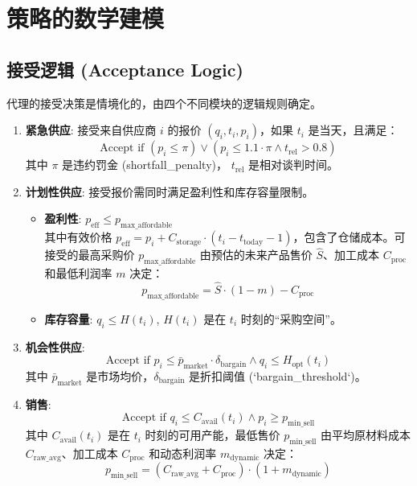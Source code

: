 \documentclass[12pt, a4paper]{article}
\begin{document}
\section{策略的数学建模}

\subsection{接受逻辑 (Acceptance Logic)}
代理的接受决策是情境化的，由四个不同模块的逻辑规则确定。

\begin{enumerate}
\item \textbf{紧急供应}: 接受来自供应商 $i$ 的报价 $(q_i, t_i, p_i)$，如果 $t_i$ 是当天，且满足：
$$
\text{Accept if } (p_i \le \pi) \lor (p_i \le 1.1 \cdot \pi \land t_{\text{rel}} > 0.8)
$$  %
其中 $\pi$ 是违约罚金 (shortfall\_penalty)， $t_{\text{rel}}$ 是相对谈判时间。

\item \textbf{计划性供应}: 接受报价需同时满足盈利性和库存容量限制。
\begin{itemize}
    \item \textbf{盈利性}: $p_{\text{eff}} \le p_{\text{max\_affordable}}$ \\ %
    其中有效价格 $p_{\text{eff}} = p_i + C_{\text{storage}} \cdot (t_i - t_{\text{today}} - 1)$，包含了仓储成本。可接受的最高采购价 $p_{\text{max\_affordable}}$ 由预估的未来产品售价 $\hat{S}$、加工成本 $C_{\text{proc}}$ 和最低利润率 $m$ 决定：
    $$
    p_{\text{max\_affordable}} = \hat{S} \cdot (1 - m) - C_{\text{proc}}
    $$ %
    \item \textbf{库存容量}: $q_i \le H(t_i)$, $H(t_i)$ 是在 $t_i$ 时刻的“采购空间”。%
\end{itemize}

\item \textbf{机会性供应}:  %
$$
\text{Accept if } p_i \le \bar{p}_{\text{market}} \cdot \delta_{\text{bargain}} \land q_i \le H_{\text{opt}}(t_i)
$$
其中 $\bar{p}_{\text{market}}$ 是市场均价，$\delta_{\text{bargain}}$ 是折扣阈值 (`bargain\_threshold`)。

\item \textbf{销售}:%
$$
\text{Accept if } q_i \le C_{\text{avail}}(t_i) \land p_i \ge p_{\text{min\_sell}}
$$
其中 $C_{\text{avail}}(t_i)$ 是在 $t_i$ 时刻的可用产能，最低售价 $p_{\text{min\_sell}}$ 由平均原材料成本 $C_{\text{raw\_avg}}$、加工成本 $C_{\text{proc}}$ 和动态利润率 $m_{\text{dynamic}}$ 决定：%
$$
p_{\text{min\_sell}} = (C_{\text{raw\_avg}} + C_{\text{proc}}) \cdot (1 + m_{\text{dynamic}})
$$
\end{enumerate}
\end{document}
